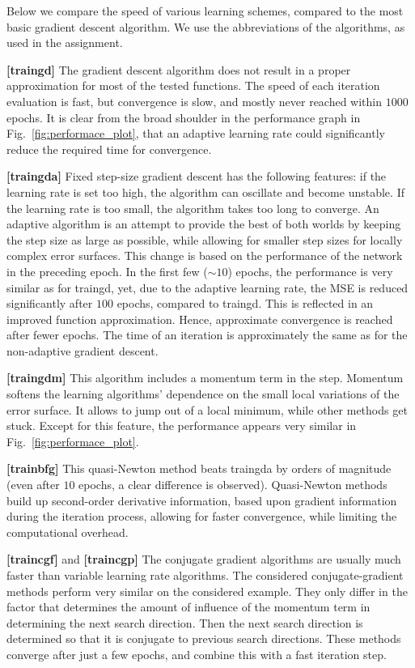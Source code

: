 \documentclass[pdftex,11pt,a4paper]{article}
\begin{document}
Below we compare the speed of various learning schemes, compared to the most basic gradient descent algorithm. We use the abbreviations of the algorithms, as used in the assignment.

\textbf{[traingd]} The gradient descent algorithm does not result in a proper approximation for most of the tested functions. The speed of each iteration evaluation is fast, but convergence is slow, and mostly never reached within $1000$ epochs. It is clear from the broad shoulder in the performance graph in Fig.~\ref{fig:performace_plot}, that an adaptive learning rate could significantly reduce the required time for convergence.

\textbf{[traingda]} Fixed step-size gradient descent has the following features: if the learning rate  is set too high, the algorithm can oscillate and become unstable. If the learning rate is too small, the algorithm takes too long to converge. An adaptive algorithm is an attempt to provide the best of both worlds by keeping the step size as large as possible, while allowing for smaller step sizes for locally complex error surfaces. This change is based on the performance of the network in the preceding epoch. 
In the first few ($\sim 10$) epochs, the performance is very similar as for traingd, yet, due to the adaptive learning rate, the MSE is reduced significantly after $100$ epochs, compared to traingd. This is reflected in an improved function approximation. Hence, approximate convergence is reached after fewer epochs. The time of an iteration is approximately the same as for the non-adaptive gradient descent. 

\textbf{[traingdm]} This algorithm includes a momentum term in the step. Momentum softens the learning algorithms' dependence on the small local variations of the error surface. It allows to jump out of a local minimum, while other methods get stuck. Except for this feature, the performance appears very similar in Fig.~\ref{fig:performace_plot}.

\textbf{[trainbfg]} This quasi-Newton method beats traingda by orders of magnitude (even after $10$ epochs, a clear difference is observed). Quasi-Newton methods build up second-order derivative information, based upon gradient information during the iteration process, allowing for faster convergence, while limiting the computational overhead.

\textbf{[traincgf]} and \textbf{[traincgp]} The conjugate gradient algorithms are usually much faster than variable learning rate algorithms. The considered conjugate-gradient methods perform very similar on the considered example. They only differ in the factor that determines the amount of influence of the momentum term in determining the next search direction. Then the next search direction is determined so that it is conjugate to previous search directions. These methods converge after just a few epochs, and combine this with a fast iteration step.
\end{document}
